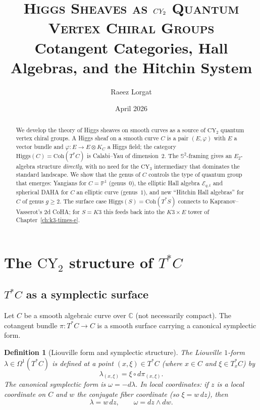 \documentclass[11pt]{article}
\title{\textsc{Higgs Sheaves as $\CY_2$ Quantum Vertex Chiral Groups}\\[6pt]
\large Cotangent Categories, Hall Algebras, and the Hitchin System}
\author{Raeez Lorgat}
\date{April 2026}
\theoremstyle{garamondthm}
\theoremstyle{garamonddef}
\newtheorem{definition}[theorem]{Definition}
\theoremstyle{garamondrem}
\newcommand{\Coh}{\mathrm{Coh}}
\newcommand{\CY}{\mathrm{CY}}
\newcommand{\Etwo}{E_2}
\newcommand{\cE}{\mathcal{E}}
\newcommand{\Higgs}{\mathrm{Higgs}}
\begin{document}
\maketitle

\begin{abstract}
We develop the theory of Higgs sheaves on smooth curves as a source of $\CY_2$ quantum vertex chiral groups. A Higgs sheaf on a smooth curve $C$ is a pair $(E, \varphi)$ with $E$ a vector bundle and $\varphi \colon E \to E \otimes K_C$ a Higgs field; the category $\Higgs(C) = \Coh(T^*C)$ is Calabi--Yau of dimension~$2$. The $\mathbb{S}^2$-framing gives an $\Etwo$-algebra structure \emph{directly}, with no need for the $\CY_3$ intermediary that dominates the standard landscape. We show that the genus of $C$ controls the type of quantum group that emerges: Yangians for $C = \mathbb{P}^1$ (genus~$0$), the elliptic Hall algebra $\cE_{q,t}$ and spherical DAHA for $C$ an elliptic curve (genus~$1$), and new ``Hitchin Hall algebras'' for $C$ of genus $g \geq 2$. The surface case $\Higgs(S) = \Coh(T^*S)$ connects to Kapranov--Vasserot's $2$d CoHA; for $S = K3$ this feeds back into the $K3 \times E$ tower of Chapter~\ref{ch:k3-times-e}.
\end{abstract}

\tableofcontents



\section{The $\CY_2$ structure of $T^*C$}
\label{sec:cy2-structure}

\subsection{$T^*C$ as a symplectic surface}
\label{ssec:symplectic-surface}

Let $C$ be a smooth algebraic curve over $\mathbb{C}$ (not necessarily compact). The cotangent bundle $\pi \colon T^*C \to C$ is a smooth surface carrying a canonical symplectic form.

\begin{definition}[Liouville form and symplectic structure]
\label{def:liouville}
The \emph{Liouville $1$-form} $\lambda \in \Omega^1(T^*C)$ is defined at a point $(x, \xi) \in T^*C$ (where $x \in C$ and $\xi \in T^*_x C$) by
\[
 \lambda_{(x,\xi)} = \xi \circ d\pi_{(x,\xi)}.
\]
The \emph{canonical symplectic form} is $\omega = -d\lambda$. In local coordinates: if $z$ is a local coordinate on $C$ and $w$ the conjugate fiber coordinate (so $\xi = w\,dz$), then
\[
 \lambda = w\,dz, \qquad \omega = dz \wedge dw.
\]
\end{definition}
\end{document}
